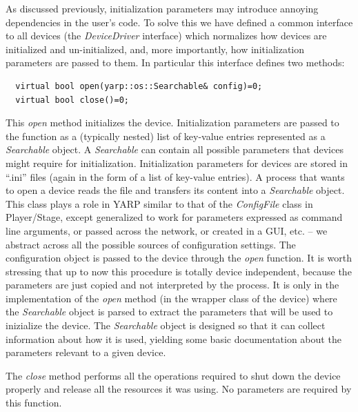 As discussed previously, initialization parameters may introduce annoying 
dependencies in the user's code. To solve this we have defined a common 
interface to all devices (the 
\emph{DeviceDriver} interface) which normalizes how devices are initialized
and un-initialized, and, more importantly, how initialization parameters 
are passed to them. In particular this interface defines two methods:
\begin{verbatim}
  virtual bool open(yarp::os::Searchable& config)=0;
  virtual bool close()=0;
\end{verbatim}
This \emph{open} method initializes the device. Initialization parameters 
are passed to the function as a (typically nested) list of key-value entries 
represented as a \emph{Searchable} object.
A \emph{Searchable} can contain all 
possible parameters that devices might require for initialization. Initialization 
parameters for devices 
are stored in ``.ini'' files (again in the form of a list of key-value 
entries).
A process that wants to open a device reads 
the file and transfers its content into a \emph{Searchable} object. 
This class
plays a role in YARP similar to that of the {\em ConfigFile} class in Player/Stage,
except generalized to work for
 parameters expressed as command line arguments, or
passed across the network, or created in a GUI, etc. -- we abstract
across all the possible sources of configuration settings.
The configuration
object is passed to the device through the \emph{open} function. 
It is worth stressing that up to now this procedure is totally device 
independent, because the parameters are just copied and not interpreted 
by the process. It is only in the implementation of the \emph{open} method 
(in the wrapper class of the device) where the \emph{Searchable} object 
is parsed to extract the parameters that will be used to inizialize the 
device.  The \emph{Searchable} object is designed so that it can
collect information about how it is used, yielding some basic
documentation about the parameters relevant to a given device.

The \emph{close} method performs all the operations required to shut down 
the device properly and release all the resources it was using. No
parameters are required by this function.

